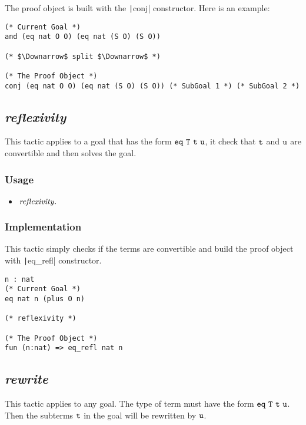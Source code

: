 The proof object is built with the \texttt|conj| constructor.
Here is an example:
\begin{center}
\begin{minipage}{\textwidth}
\begin{verbatim}
(* Current Goal *)
and (eq nat O O) (eq nat (S O) (S O))

(* $\Downarrow$ split $\Downarrow$ *)

(* The Proof Object *)
conj (eq nat O O) (eq nat (S O) (S O)) (* SubGoal 1 *) (* SubGoal 2 *)
\end{verbatim}
\end{minipage}
\end{center}


\subsection{\it reflexivity}
This tactic applies to a goal that has the form $\tt eq\ T\ t\ u$, it check that $\tt t$ and $\tt u$ 
are convertible and then solves the goal.

\subsubsection*{Usage}
\begin{itemize}
\item ${\it reflexivity}.$
\end{itemize}

\subsubsection*{Implementation}
This tactic simply checks if the terms are convertible and build the proof object with \texttt|eq_refl| constructor.

\begin{center}
\begin{minipage}{0.7\textwidth}
\begin{verbatim}
n : nat
(* Current Goal *)  
eq nat n (plus O n)   

(* reflexivity *)

(* The Proof Object *)
fun (n:nat) => eq_refl nat n
\end{verbatim}
\end{minipage}
\end{center}

\subsection{\it rewrite}
This tactic applies to any goal.
The type of term must have the form $\tt eq\ T\ t\ u$.
Then the subterms $\tt t$ in the goal will be rewritten by $\tt u$.

